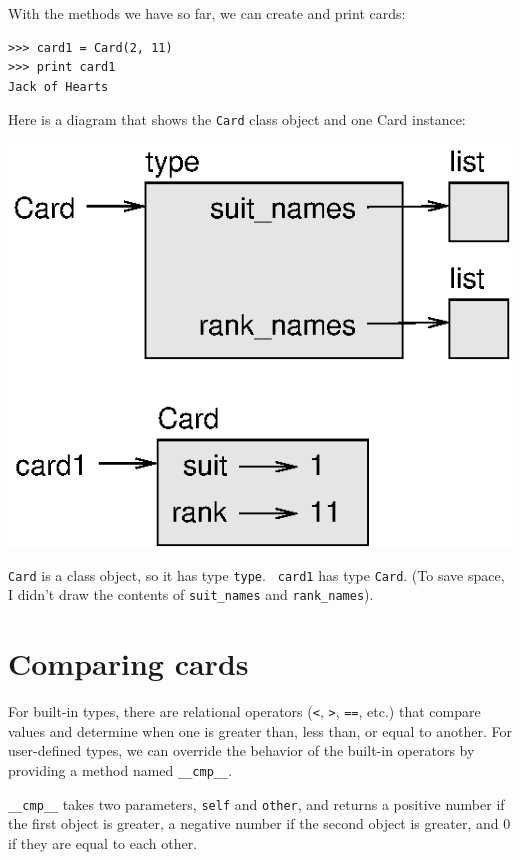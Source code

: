 \documentclass[10pt]{book}
\begin{document}
{With the methods we have so far, we can create and print cards:

\beforeverb
\begin{verbatim}
>>> card1 = Card(2, 11)
>>> print card1
Jack of Hearts
\end{verbatim}
\afterverb
%
Here is a diagram that shows the {\tt Card} class object
and one Card instance:


\beforefig
\centerline{\includegraphics{figs/card1.eps}}
\afterfig

{\tt Card} is a class object, so it has type {\tt type}.  {\tt
card1} has type {\tt Card}.  (To save space, I didn't draw the
contents of \verb"suit_names" and \verb"rank_names").


\section{Comparing cards}
\label{comparecard}


For built-in types, there are relational operators
({\tt <}, {\tt >}, {\tt ==}, etc.)
that compare
values and determine when one is greater than, less than, or equal to
another.  For user-defined types, we can override the behavior of
the built-in operators by providing a method named
\verb"__cmp__".  

\verb"__cmp__" takes two parameters, {\tt self} and {\tt other},
and returns a positive number if the first object is greater, a
negative number if the second object is greater, and 0 if they are
equal to each other.

}
\end{document}
